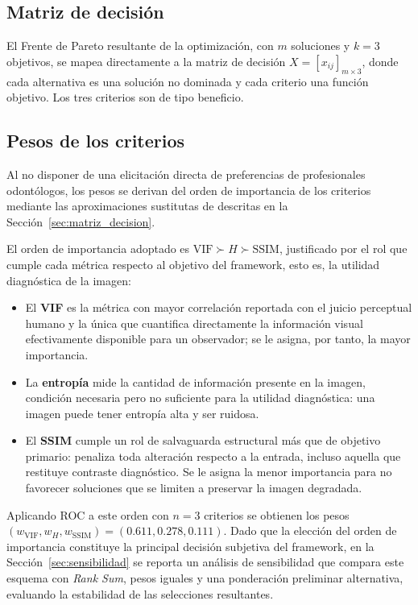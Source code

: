 \subsection{Matriz de decisión}

El Frente de Pareto resultante de la optimización, con $m$ soluciones y $k = 3$ objetivos, se mapea directamente a la matriz de decisión $X = [x_{ij}]_{m \times 3}$, donde cada alternativa es una solución no dominada y cada criterio una función objetivo. Los tres criterios son de tipo beneficio.

\subsection{Pesos de los criterios}
\label{sec:pesos}

Al no disponer de una elicitación directa de preferencias de profesionales odontólogos, los pesos se derivan del orden de importancia de los criterios mediante las aproximaciones sustitutas de \citet{Roberts2002} descritas en la Sección~\ref{sec:matriz_decision}.

El orden de importancia adoptado es $\text{VIF} \succ H \succ \text{SSIM}$, justificado por el rol que cumple cada métrica respecto al objetivo del framework, esto es, la utilidad diagnóstica de la imagen:

\begin{itemize}
    \item El \textbf{VIF} es la métrica con mayor correlación reportada con el juicio perceptual humano \citep{Sheikh2006} y la única que cuantifica directamente la información visual efectivamente disponible para un observador; se le asigna, por tanto, la mayor importancia.
    \item La \textbf{entropía} mide la cantidad de información presente en la imagen, condición necesaria pero no suficiente para la utilidad diagnóstica: una imagen puede tener entropía alta y ser ruidosa.
    \item El \textbf{SSIM} cumple un rol de salvaguarda estructural más que de objetivo primario: penaliza toda alteración respecto a la entrada, incluso aquella que restituye contraste diagnóstico. Se le asigna la menor importancia para no favorecer soluciones que se limiten a preservar la imagen degradada.
\end{itemize}

Aplicando ROC a este orden con $n = 3$ criterios se obtienen los pesos $(w_{\text{VIF}}, w_{H}, w_{\text{SSIM}}) = (0.611, 0.278, 0.111)$. Dado que la elección del orden de importancia constituye la principal decisión subjetiva del framework, en la Sección~\ref{sec:sensibilidad} se reporta un análisis de sensibilidad que compara este esquema con \textit{Rank Sum}, pesos iguales y una ponderación preliminar alternativa, evaluando la estabilidad de las selecciones resultantes.

